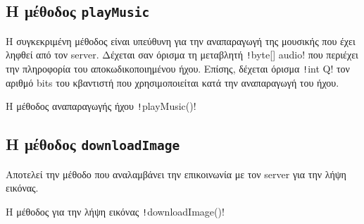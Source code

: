 \subsection{Η μέθοδος \texttt{playMusic}}\label{section:playMusic}
Η συγκεκριμένη μέθοδος είναι υπεύθυνη για την αναπαραγωγή της μουσικής που έχει ληφθεί από τον server.
Δέχεται σαν όρισμα τη μεταβλητή \texttt!byte[] audio! που περιέχει την πληροφορία του αποκωδικοποιημένου ήχου.
Επίσης, δέχεται όρισμα \texttt!int Q! τον αριθμό bits του κβαντιστή που χρησιμοποιείται κατά την αναπαραγωγή του ήχου.
\begin{code}
\caption{Η μέθοδος αναπαραγωγής ήχου \texttt!playMusic()!}
\end{code}

\subsection{Η μέθοδος \texttt{downloadImage}}
Αποτελεί την μέθοδο που αναλαμβάνει την επικοινωνία με τον server για την λήψη εικόνας.
\begin{code}
\caption{Η μέθοδος για την λήψη εικόνας \texttt!downloadImage()!}
\end{code}

